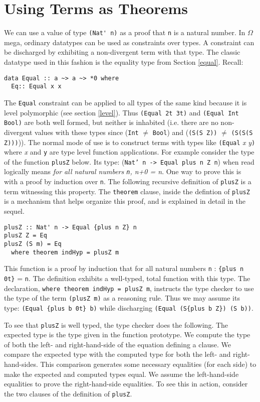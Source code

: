 \documentclass[11pt,twoside,A4]{llncs}
\newcommand{\om}{\emph{$\Omega$}mega}
\begin{document}
\section{Using Terms as Theorems}\label{theorem}

We can use a value of type \verb+(Nat' n)+ as a proof
that \verb+n+ is a natural number. In \om, ordinary
datatypes can be used as constraints over types. A constraint
can be discharged by exhibiting a non-divergent term with that type.
The classic datatype used in this fashion is the equality type
from Section \ref{equal}. Recall:
\begin{verbatim}
data Equal :: a ~> a ~> *0 where
  Eq:: Equal x x
\end{verbatim}
The \verb+Equal+ constraint can be applied to all types of the same kind
because it is level polymorphic (see section \ref{level}).
Thus \verb+(Equal 2t 3t)+ and \verb+(Equal Int Bool)+ are both
well formed, but neither is inhabited (i.e. there are no non-divergent values with these types
since (\verb+Int+ $\neq$ \verb+Bool+) and (\verb+(S(S Z))+ $\neq$ \verb+(S(S(S Z)))+)).
The normal mode of use is to construct terms with types
like {\tt (Equal} {\it x} {\it y}{\tt )} 
where {\it x} and {\tt y} are type
level function applications. 
For example consider the type of the function \verb+plusZ+ below.
Its type: ({\tt Nat' n -> Equal {plus n Z} n}) when read logically means
{\it for all natural numbers {\tt n}, n+0 = n}. One way
to prove this is with a proof by induction over {\tt n}. The following
recursive definition of {\tt plusZ} is a term witnessing
this property. The {\tt theorem} clause, inside the
defintion of {\tt plusZ} is a mechanism that helps organize this
proof, and is explained in detail in the sequel.

{\small
\begin{verbatim}
plusZ :: Nat' n -> Equal {plus n Z} n
plusZ Z = Eq
plusZ (S m) = Eq
  where theorem indHyp = plusZ m
\end{verbatim}}

This function is a proof by induction
that for all natural numbers {\tt n} : \verb+{plus n 0t}+ =  \verb+n+. The
definition exhibits a well-typed, total function with this type.
The declaration, \verb+where theorem indHyp = plusZ m+, instructs the
type checker to use the type of the term \verb+(plusZ m)+ as a reasoning rule.
Thus we may assume its type: \verb+(Equal {plus b 0t} b)+
while discharging \verb+(Equal (S{plus b Z}) (S b))+.

To see that {\tt plusZ} is well typed, the type checker does the following.
The expected type is the type given in the function prototype. We
compute the type of both the left- and right-hand-side of the equation
defining a clause. We compare the expected type with the computed type
for both the left- and right-hand-sides. This comparison generates
some necessary equalities (for each side) to make the expected and computed
types equal. We assume the left-hand-side
equalities to prove the right-hand-side equalities. To see this in
action, consider the two clauses of the definition of \verb+plusZ+.
\end{document}
